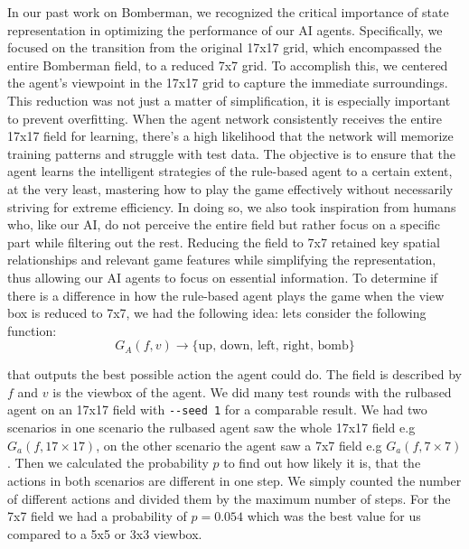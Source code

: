 In our past work on Bomberman, we recognized the critical importance of state representation in optimizing the performance 
of our AI agents. Specifically, we focused on the transition from the original 17x17 grid, which encompassed the entire Bomberman field, 
to a reduced 7x7 grid. To accomplish this, we centered the agent's viewpoint in the 17x17 grid to capture the immediate surroundings. 
This reduction was not just a matter of simplification, it is especially important to prevent overfitting. When the agent network consistently 
receives the entire 17x17 field for learning, there's a high likelihood that the network will memorize training patterns and struggle with test data. 
The objective is to ensure that the agent learns the intelligent strategies of the rule-based agent to a certain extent, at the very least, mastering how 
to play the game effectively without necessarily striving for extreme efficiency. In doing so, we also took inspiration from humans who, like our AI, do not perceive 
the entire field but rather focus on a specific part while filtering out the rest.
Reducing the field to 7x7 retained key spatial relationships 
and relevant game features while simplifying the representation, thus allowing our AI agents to focus on essential information.
To determine if there is a difference in how the rule-based agent plays the game when the view box is reduced to 7x7, we had the following idea:
lets consider the following function: 
\begin{equation} \label{eq:1}
G_A(f,v) \rightarrow \{\text{up, down, left, right, bomb}\}
\end{equation}

that outputs the best possible action the agent could do. The field is described by $f$ and $v$ is the viewbox of the agent. We did many 
test rounds with the rulbased agent on an 17x17 field with \verb|--seed 1| for a comparable result. We had two scenarios
in one scenario the rulbased agent saw the whole 17x17 field e.g $G_a(f, 17\times17)$, on the other scenario the agent saw a
7x7 field e.g $G_a(f, 7\times7)$. Then we calculated the probability $p$ to find out how likely it is, that the actions in both scenarios are different in one step.
We simply counted the number of different actions and divided them by the maximum number of steps.
For the 7x7 field we had a probability of $p=0.054$ which was the best value for us compared to a 5x5 or 3x3 viewbox.\\

